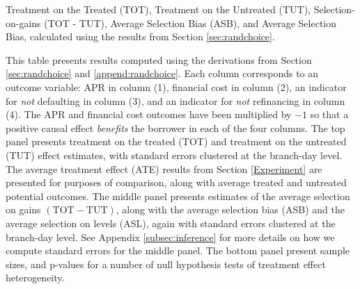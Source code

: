 \documentclass[oneside,11pt]{article}
\begin{document}
\cleardoublepage

\begin{table}[H]
\caption{Treatment on the Treated (TOT), Treatment on the Untreated (TUT), Selection-on-gains (TOT - TUT), Average Selection Bias (ASB), and Average Selection Bias, calculated using the results from Section \ref{sec:randchoice}.}
\label{tot_tut}
\begin{center}
\scriptsize{}
\end{center}
\scriptsize
This table presents results computed using the derivations from Section \ref{sec:randchoice} and \ref{append:randchoice}. 
Each column corresponds to an outcome variable: APR in column (1), financial cost in column (2), an indicator for \emph{not} defaulting in column (3), and an indicator for \emph{not} refinancing in column (4). 
The APR and financial cost outcomes have been multiplied by $-1$ so that a positive causal effect \emph{benefits} the borrower in each of the four columns.
The top panel presents treatment on the treated (TOT) and treatment on the untreated (TUT) effect estimates, with standard errors clustered at the branch-day level.
The average treatment effect (ATE) results from Section \ref{Experiment} are presented for purposes of comparison, along with average treated and untreated potential outcomes.
The middle panel presents estimates of the average selection on gains $(\text{TOT} - \text{TUT})$, along with the average selection bias (ASB) and the average selection on levels (ASL), again with standard errors clustered at the branch-day level.
See Appendix \ref{subsec:inference} for more details on how we compute standard errors for the middle panel.
The bottom panel present sample sizes, and p-values for a number of null hypothesis tests of treatment effect heterogeneity. 
\end{table}
\end{document}
